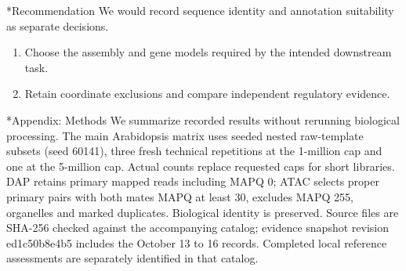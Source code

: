 \documentclass[10pt,letterpaper]{article}
\makeatletter
\renewcommand\section{\@startsection{section}{1}{\z@}{9pt}{4pt}{\large\bfseries}}
\makeatother
\begin{document}
\section*{Recommendation}
We would record sequence identity and annotation suitability as separate decisions.

\begin{enumerate}
\item Choose the assembly and gene models required by the intended downstream task.
\item Retain coordinate exclusions and compare independent regulatory evidence.
\end{enumerate}
\section*{Appendix: Methods}
We summarize recorded results without rerunning biological processing. The main Arabidopsis matrix uses seeded nested raw-template subsets (seed 60141), three fresh technical repetitions at the 1-million cap and one at the 5-million cap. Actual counts replace requested caps for short libraries. DAP retains primary mapped reads including MAPQ 0; ATAC selects proper primary pairs with both mates MAPQ at least 30, excludes MAPQ 255, organelles and marked duplicates. Biological identity is preserved. Source files are SHA-256 checked against the accompanying catalog; evidence snapshot revision ed1c50b8e4b5 includes the October 13 to 16 records. Completed local reference assessments are separately identified in that catalog.
\end{document}
